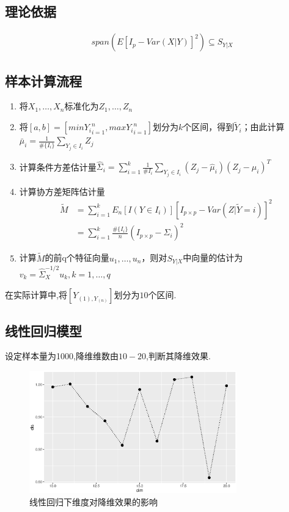 \subsection{理论依据}
\begin{align*}
    &span(E[I_p-Var(X|Y)]^2) \subseteq S_{Y|X}
\end{align*}
\subsection{样本计算流程}
\begin{enumerate}
    \item 将$X_1,\dots,X_n$标准化为$Z_1,\dots,Z_n$
    \item 将$[a,b]=[min{Y_i}_{i=1}^n,max{Y_i}_{i=1}^n]$划分为$k$个区间，得到$\widetilde{Y}_i$；由此计算$\bar{\mu}_i=\frac{1}{\#\{I_i\}}\sum_{Y_j\in I_i}Z_j$
    \item 计算条件方差估计量$\hat{\Sigma}_i=\sum_{i=1}^k\frac{1}{\#I_i}\sum_{Y_j\in I_i}(Z_j-\hat{\mu}_i)(Z_j-\hat{\mu}_i)^T$
    \item 计算协方差矩阵估计量
    \begin{align*}
        \widetilde{M}&=\sum_{i=1}^kE_n[I(Y\in I_i)] [I_{p\times p}-Var(Z|\widetilde{Y}=i)]^2 \\
        &=\sum_{i=1}^k\frac{\#\{I_i\}}{n}(I_{p\times p}-\hat{\Sigma}_i)^2
    \end{align*}
    \item 计算$\widetilde{M}$的前q个特征向量$u_1,\dots,u_n$，则对$S_{Y|X}$中向量的估计为$v_k=\hat{\Sigma}_{X}^{-1/2}u_k,k=1,\dots,q$
    
\end{enumerate}
在实际计算中,将$[Y_{(1),Y_(n)}]$划分为$10$个区间.
\subsection{线性回归模型}
设定样本量为1000,降维维数由$10-20$,判断其降维效果.
\begin{figure}[H]
    \centering
    \includegraphics[width=0.8\textwidth]{image/norm_save.eps}
    \caption{线性回归下维度对降维效果的影响}
\end{figure}


